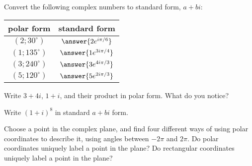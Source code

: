 \documentclass[space,nooutcomes]{ximera}
\begin{document}
\begin{problem}
Convert the following complex numbers to standard form, $a+bi$: 

\begin{center}
\begin{tabular}{c | c}
polar form & standard form \\
\hline
$(2; 30^\circ)$  & $\answer{2e^{i\pi/6}}$ \\
$(1; 135^\circ)$ & $\answer{1e^{3i\pi/4}}$ \\
$(3; 240^\circ)$ & $\answer{3e^{4i\pi/3}}$ \\
$(5; 120^\circ)$ & $\answer{5e^{2i\pi/3}}$ \\
 \end{tabular}
\end{center}
\end{problem}

\newpage 

\begin{problem}
Write $3 + 4i$, $1 + i$, and their product in polar form.  What do you notice?  
\vfill 
\end{problem}

\begin{problem}
Write $(1 + i)^8$ in standard $a + bi$ form.  
\vfill 
\end{problem}

\begin{problem}
Choose a point in the complex plane, and find four different ways of using polar coordinates to describe it, using angles between $-2\pi$ and $2\pi$.  
Do polar coordinates uniquely label a point in the plane?
Do rectangular coordinates uniquely label a point in the plane?
\vfill 
\end{problem}
\end{document}
